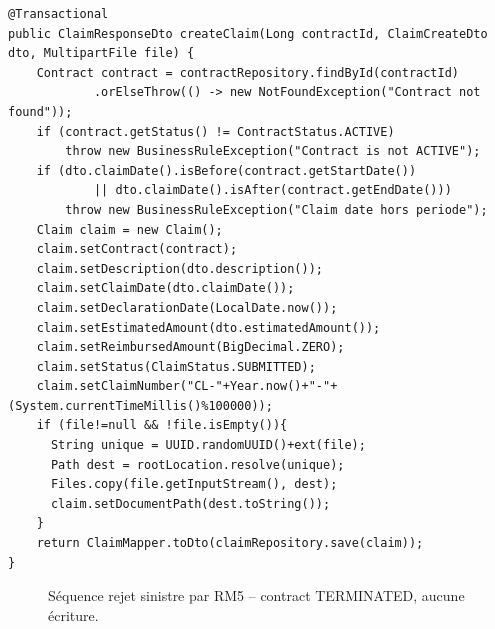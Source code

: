 \documentclass[a4paper,12pt]{article}
\begin{document}
\begin{lstlisting}[caption={RM5/RM6 + upload fichier -- version finale avec MultipartFile.},label={lst:claim}]
@Transactional
public ClaimResponseDto createClaim(Long contractId, ClaimCreateDto dto, MultipartFile file) {
    Contract contract = contractRepository.findById(contractId)
            .orElseThrow(() -> new NotFoundException("Contract not found"));
    if (contract.getStatus() != ContractStatus.ACTIVE)
        throw new BusinessRuleException("Contract is not ACTIVE");
    if (dto.claimDate().isBefore(contract.getStartDate())
            || dto.claimDate().isAfter(contract.getEndDate()))
        throw new BusinessRuleException("Claim date hors periode");
    Claim claim = new Claim();
    claim.setContract(contract);
    claim.setDescription(dto.description());
    claim.setClaimDate(dto.claimDate());
    claim.setDeclarationDate(LocalDate.now());
    claim.setEstimatedAmount(dto.estimatedAmount());
    claim.setReimbursedAmount(BigDecimal.ZERO);
    claim.setStatus(ClaimStatus.SUBMITTED);
    claim.setClaimNumber("CL-"+Year.now()+"-"+(System.currentTimeMillis()%100000));
    if (file!=null && !file.isEmpty()){
      String unique = UUID.randomUUID()+ext(file);
      Path dest = rootLocation.resolve(unique);
      Files.copy(file.getInputStream(), dest);
      claim.setDocumentPath(dest.toString());
    }
    return ClaimMapper.toDto(claimRepository.save(claim));
}
\end{lstlisting}

\begin{figure}[htbp]
\centering
{}
\caption{Séquence rejet sinistre par RM5 -- contract TERMINATED, aucune écriture.}
\label{fig:sinistre}
\end{figure}
\end{document}
